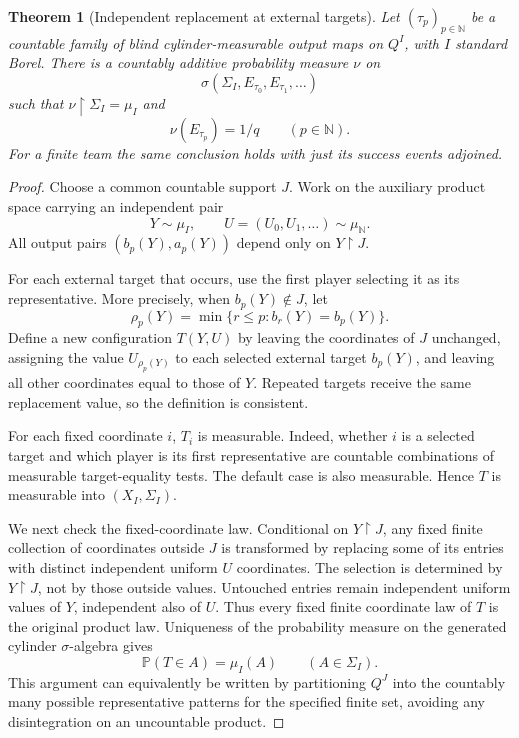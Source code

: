 \documentclass[11pt,letterpaper]{article}
\newtheorem{theorem}{Theorem}[section]
\theoremstyle{definition}
\newcommand{\N}{\mathbb N}
\newcommand{\Prb}{\mathbb P}
\newcommand{\Sig}{\Sigma}
\newcommand{\sg}{\sigma}
\newcommand{\restr}{\mathbin{\upharpoonright}}
\begin{document}
\begin{theorem}[Independent replacement at external targets]
\label{mbg:thm:fresh}
Let $(\tau_p)_{p\in\N}$ be a countable family of blind cylinder-measurable output maps on $Q^I$, with $I$ standard Borel. There is a countably additive probability measure $\nu$ on
\[
 \sg(\Sig_I,E_{\tau_0},E_{\tau_1},\ldots)
\]
such that $\nu\restr\Sig_I=\mu_I$ and
\[
 \nu(E_{\tau_p})=1/q\qquad(p\in\N).
\]
For a finite team the same conclusion holds with just its success events adjoined.
\end{theorem}
\begin{proof}
Choose a common countable support $J$. Work on the auxiliary product space carrying an independent pair
\[
 Y\sim\mu_I,\qquad U=(U_0,U_1,\ldots)\sim\mu_\N.
\]
All output pairs $(b_p(Y),a_p(Y))$ depend only on $Y\restr J$.

For each external target that occurs, use the first player selecting it as its representative. More precisely, when $b_p(Y)\notin J$, let
\[
 \rho_p(Y)=\min\{r\le p:b_r(Y)=b_p(Y)\}.
\]
Define a new configuration $T(Y,U)$ by leaving the coordinates of $J$ unchanged, assigning the value $U_{\rho_p(Y)}$ to each selected external target $b_p(Y)$, and leaving all other coordinates equal to those of $Y$. Repeated targets receive the same replacement value, so the definition is consistent.

For each fixed coordinate $i$, $T_i$ is measurable. Indeed, whether $i$ is a selected target and which player is its first representative are countable combinations of measurable target-equality tests. The default case is also measurable. Hence $T$ is measurable into $(X_I,\Sig_I)$.

We next check the fixed-coordinate law. Conditional on $Y\restr J$, any fixed finite collection of coordinates outside $J$ is transformed by replacing some of its entries with distinct independent uniform $U$ coordinates. The selection is determined by $Y\restr J$, not by those outside values. Untouched entries remain independent uniform values of $Y$, independent also of $U$. Thus every fixed finite coordinate law of $T$ is the original product law. Uniqueness of the probability measure on the generated cylinder $\sigma$-algebra gives
\[
 \Prb(T\in A)=\mu_I(A)\qquad(A\in\Sig_I).
\]
This argument can equivalently be written by partitioning $Q^J$ into the countably many possible representative patterns for the specified finite set, avoiding any disintegration on an uncountable product.


\end{proof}
\end{document}
